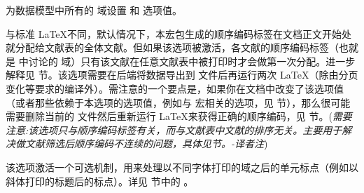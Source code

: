 \begin{optionlist}

为数据模型中所有的  域设置  和  选项值。


与标准 \LaTeX 不同，默认情况下，本宏包生成的顺序编码标签在文档正文开始处就分配给文献表的全体文献。但如果该选项被激活，各文献的顺序编码标签（也就是  中讨论的  域）只有该文献在任意文献表中被打印时才会做第一次分配。进一步解释见  节。该选项需要在后端将数据导出到  文件后再运行两次 \LaTeX （除由分页变化等要求的编译外）。需注意的一个要点是，如果你在文档中改变了该选项值（或者那些依赖于本选项的选项值，例如与 宏相关的选项，见 节），那么很可能需要删除当前的  文件然后重新运行 \LaTeX 来获得正确的顺序编码，见  节。(\emph{需要注意:该选项只与顺序编码标签有关，而与文献表中文献的排序无关。主要用于解决做文献筛选后顺序编码不连续的问题，具体见节。-译者注})


该选项激活一个可选机制，用来处理以不同字体打印的域之后的单元标点（例如以斜体打印的标题后的标点）。详见  节中的 。


\end{optionlist}
